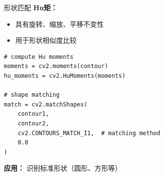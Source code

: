 \begin{frame}[fragile]{形状匹配}
    \textbf{Hu矩：}
    \begin{itemize}
        \item 具有旋转、缩放、平移不变性
        \item 用于形状相似度比较
    \end{itemize}

    \begin{lstlisting}[basicstyle=\ttfamily\scriptsize]
# compute Hu moments
moments = cv2.moments(contour)
hu_moments = cv2.HuMoments(moments)

# shape matching
match = cv2.matchShapes(
    contour1,
    contour2,
    cv2.CONTOURS_MATCH_I1,  # matching method
    0.0
)
    \end{lstlisting}

    \textbf{应用：} 识别标准形状（圆形、方形等）

\end{frame}
